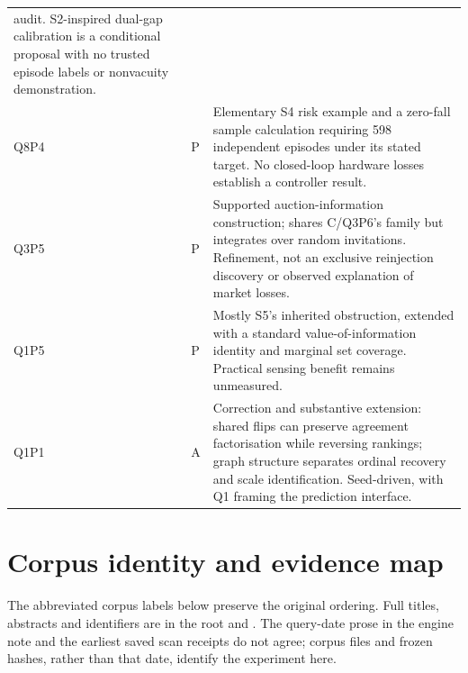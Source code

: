 \documentclass[11pt,a4paper]{article}
\begin{document}
\begin{longtable}{p{17mm}p{7mm}p{112mm}}
audit. S2-inspired dual-gap calibration is a conditional proposal with no
trusted episode labels or nonvacuity demonstration.\\
Q8P4&P&Elementary S4 risk example and a zero-fall sample calculation
requiring 598 independent episodes under its stated target. No closed-loop
hardware losses establish a controller result.\\
Q3P5&P&Supported auction-information construction; shares C/Q3P6's family
but integrates over random invitations. Refinement, not an exclusive
reinjection discovery or observed explanation of market losses.\\
Q1P5&P&Mostly S5's inherited obstruction, extended with a standard
value-of-information identity and marginal set coverage. Practical sensing
benefit remains unmeasured.\\
Q1P1&A&Correction and substantive extension: shared flips can preserve
agreement factorisation while reversing rankings; graph structure separates
ordinal recovery and scale identification. Seed-driven, with Q1 framing
the prediction interface.\\
\bottomrule
\end{longtable}
\normalsize

\section{Corpus identity and evidence map}
\label{app:corpus}

The abbreviated corpus labels below preserve the original ordering. Full
titles, abstracts and identifiers are in the root  and
. The query-date prose in the engine note and the earliest
saved scan receipts do not agree; corpus files and frozen hashes, rather
than that date, identify the experiment here.
\end{document}
